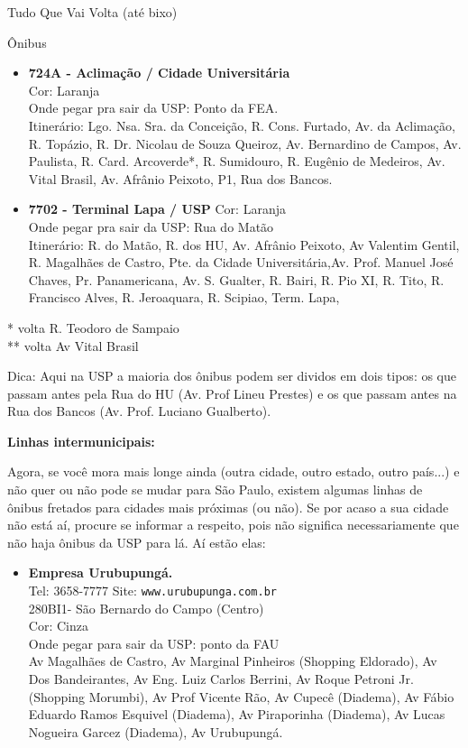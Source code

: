 \begin{secao}{Tudo Que Vai Volta (até bixo)}
\begin{subsecao}{Ônibus}
\begin{itemize}
  \item {\bf  724A - Aclimação / Cidade Universitária}\\
    Cor: Laranja\\
    Onde pegar pra sair da USP: Ponto da FEA.\\
    Itinerário:  Lgo. Nsa. Sra. da Conceição, R. Cons. Furtado, Av. da Aclimação, 
    R. Topázio, R. Dr. Nicolau de Souza Queiroz, Av. Bernardino de Campos,
    Av. Paulista, R. Card. Arcoverde*, R. Sumidouro, R. Eugênio de Medeiros,
    Av. Vital Brasil, Av. Afrânio Peixoto, P1, Rua dos Bancos.

  \item {\bf 7702 - Terminal Lapa / USP}
    Cor: Laranja\\
    Onde pegar pra sair da USP: Rua do Matão\\
    Itinerário:  R. do Matão, R. dos HU, Av. Afrânio Peixoto, Av Valentim Gentil,	 
    R. Magalhães de Castro, Pte. da Cidade Universitária,Av. Prof. Manuel José Chaves,
    Pr. Panamericana, Av. S. Gualter, R. Bairi, R. Pio XI, R. Tito, R. Francisco Alves,
	R. Jeroaquara, R. Scipiao, Term. Lapa,	 

\end{itemize}
* volta R. Teodoro de Sampaio\\
** volta Av Vital Brasil
 

Dica: Aqui na USP a maioria dos ônibus podem ser dividos em dois tipos: os que
passam antes pela Rua do HU (Av. Prof Lineu Prestes) e os
que passam antes na Rua dos Bancos (Av. Prof. Luciano Gualberto).


{\bf Linhas intermunicipais:}

Agora, se você mora mais longe ainda (outra cidade, outro estado, outro país...) e não quer ou não pode se mudar para São Paulo, existem algumas linhas de ônibus fretados para cidades mais próximas (ou não). Se por acaso a sua cidade não está aí, procure se informar a respeito, pois não significa necessariamente que não haja ônibus da USP para lá. Aí estão elas:

\begin{itemize}
  \item {\bf Empresa Urubupungá.}\\
    Tel: 3658-7777
    Site: {\tt www.urubupunga.com.br}\\
    280BI1- São Bernardo do Campo (Centro)\\
    Cor: Cinza\\
    Onde pegar para sair da USP: ponto da FAU\\
    Av Magalhães de Castro, Av Marginal Pinheiros (Shopping Eldorado), Av Dos
    Bandeirantes, Av Eng. Luiz Carlos Berrini, Av Roque Petroni Jr. (Shopping
    Morumbi), Av Prof Vicente Rão, Av Cupecê (Diadema), Av Fábio Eduardo Ramos
    Esquivel (Diadema), Av Piraporinha (Diadema), Av Lucas Nogueira Garcez
    (Diadema), Av Urubupungá.


\end{itemize}
\end{subsecao}
\end{secao}
